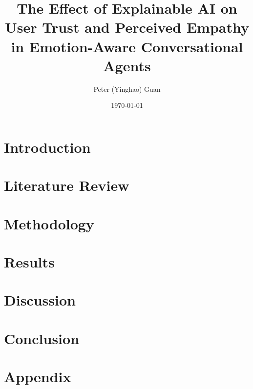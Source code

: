 \documentclass[12pt, a4paper]{article}
\title{\textbf{The Effect of Explainable AI on User Trust and Perceived Empathy in Emotion-Aware Conversational Agents}}
\author{Peter (Yinghao) Guan}
\date{\today}
\begin{document}
\maketitle


\clearpage %

\section{Introduction}

\clearpage

\section{Literature Review}

\clearpage

\section{Methodology}

\clearpage

\section{Results}

\clearpage

\section{Discussion}

\clearpage

\section{Conclusion}

\clearpage

\printbibliography
\clearpage

\appendix
\section{Appendix}
% 
\end{document}
